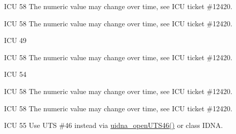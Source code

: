 \begin{DoxyRefList}
%
I\+CU 58 The numeric value may change over time, see I\+CU ticket \#12420.  
\item[Member \mbox{\hyperlink{uchar_8h_ae40d616419e74ecc7c80a9febab03199a76a393866f6e31ec7e2ce38accb1a07e}{U\+C\+H\+A\+R\+\_\+\+S\+T\+R\+I\+N\+G\+\_\+\+L\+I\+M\+IT}} ]\label{deprecated__deprecated000014}%
%
I\+CU 58 The numeric value may change over time, see I\+CU ticket \#12420.  
\item[Member \mbox{\hyperlink{uchar_8h_ae40d616419e74ecc7c80a9febab03199a72aa23c18c5fddce0751ad9a89e3c329}{U\+C\+H\+A\+R\+\_\+\+U\+N\+I\+C\+O\+D\+E\+\_\+1\+\_\+\+N\+A\+ME}} ]\label{deprecated__deprecated000013}%
%
I\+CU 49  
\item[Member \mbox{\hyperlink{ucnv_8h_a402221896b6d7153b14a5ff8dadde806a33cced69d47e6de3cbfd79d17f88fcaf}{U\+C\+N\+V\+\_\+\+S\+E\+T\+\_\+\+C\+O\+U\+NT}} ]\label{deprecated__deprecated000039}%
%
I\+CU 58 The numeric value may change over time, see I\+CU ticket \#12420.  
\item[Member \mbox{\hyperlink{uvernum_8h_afe1876131fafff3bdedeab2278c478b5}{U\+C\+O\+L\+\_\+\+T\+A\+I\+L\+O\+R\+I\+N\+G\+S\+\_\+\+V\+E\+R\+S\+I\+ON}} ]\label{deprecated__deprecated000241}%
%
I\+CU 54  
\item[Member \mbox{\hyperlink{ucurr_8h_acb76397692c3225539789ce239a6c306a02fd7458fd10b49b954838b3ce47b323}{U\+C\+U\+R\+R\+\_\+\+U\+S\+A\+G\+E\+\_\+\+C\+O\+U\+NT}} ]\label{deprecated__deprecated000040}%
%
I\+CU 58 The numeric value may change over time, see I\+CU ticket \#12420.  
\item[Member \mbox{\hyperlink{udata_8h_a3a91c39b2841eb9f6d85e65771e39a1da110ecbed30add8d95c1515c8bc2d6646}{U\+D\+A\+T\+A\+\_\+\+F\+I\+L\+E\+\_\+\+A\+C\+C\+E\+S\+S\+\_\+\+C\+O\+U\+NT}} ]\label{deprecated__deprecated000041}%
%
I\+CU 58 The numeric value may change over time, see I\+CU ticket \#12420.  
\item[Member \mbox{\hyperlink{uidna_8h_a5bea799269f02f5b3395d6b2c068b618a40c036f35732a85a90d042ca285a563f}{U\+I\+D\+N\+A\+\_\+\+A\+L\+L\+O\+W\+\_\+\+U\+N\+A\+S\+S\+I\+G\+N\+ED}} ]\label{deprecated__deprecated000047}%
%
I\+CU 55 Use U\+TS \#46 instead via \mbox{\hyperlink{uidna_8h_a496784232f4e8caa154d0b3bae5debd6}{uidna\+\_\+open\+U\+T\+S46()}} or class I\+D\+NA.  

\end{DoxyRefList}
